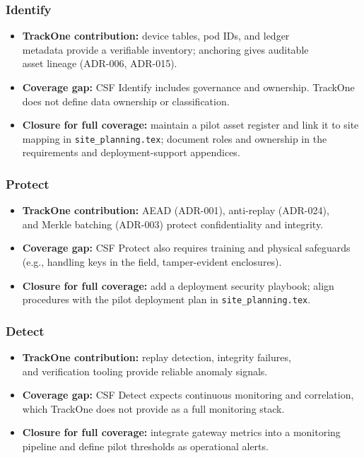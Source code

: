 \subsubsection{Identify}
\begin{itemize}[nosep]
  \item \textbf{TrackOne contribution:} device tables, pod IDs, and ledger\\ metadata provide a verifiable inventory; anchoring gives auditable\\ asset lineage (\ac{ADR}-006, \ac{ADR}-015).
  \item \textbf{Coverage gap:} C\ac{SF} Identify includes governance and ownership.
  TrackOne does not define data ownership or classification.
  \item \textbf{Closure for full coverage:} maintain a pilot asset register and link it to site mapping in \texttt{site\_planning.tex}; document roles and ownership in the requirements and deployment-support appendices.
\end{itemize}

\subsubsection{Protect}
\begin{itemize}[nosep]
  \item \textbf{TrackOne contribution:} \ac{AEAD} (\ac{ADR}-001), anti-replay (\ac{ADR}-024),\\ and Merkle batching (\ac{ADR}-003) protect confidentiality and integrity.
  \item \textbf{Coverage gap:} C\ac{SF} Protect also requires training and physical safeguards (e.g., handling keys in the field, tamper-evident enclosures).
  \item \textbf{Closure for full coverage:} add a deployment security playbook; align procedures with the pilot deployment plan in \texttt{site\_planning.tex}.
\end{itemize}

\subsubsection{Detect}
\begin{itemize}[nosep]
  \item \textbf{TrackOne contribution:} replay detection, integrity failures,\\ and verification tooling provide reliable anomaly signals.
  \item \textbf{Coverage gap:} C\ac{SF} Detect expects continuous monitoring and correlation, which TrackOne does not provide as a full monitoring stack.
  \item \textbf{Closure for full coverage:} integrate gateway metrics into a monitoring pipeline and define pilot thresholds as operational alerts.
\end{itemize}

